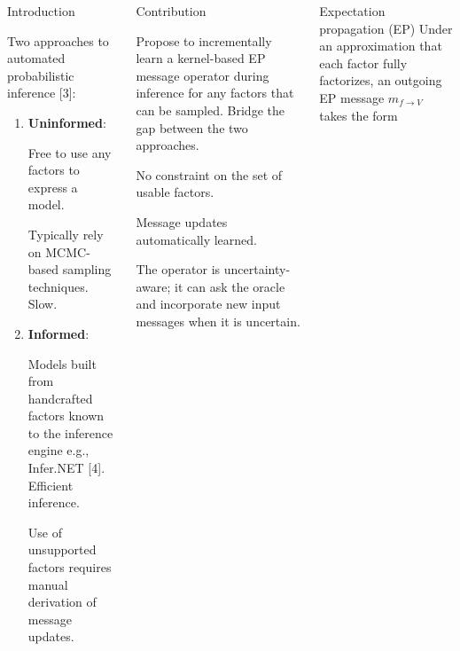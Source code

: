 \documentclass[english]{beamer}
\DeclareMathOperator*{\proj}{\text{proj}} %
\begin{document}
\newcommand{\Vskip}{\vspace{5mm}}
\begin{frame}


\vspace{-5mm}
\begin{columns}[t]


\begin{block}{Introduction }

\justifying{}Two approaches to automated probabilistic inference
{[}3{]}:
\begin{enumerate}
\item \justifying{}\textbf{Uninformed}: 


\Vskip{}\Smile{} Free to use any factors to express a model.


\Vskip{}\Frown{} Typically rely on MCMC-based sampling techniques.
Slow.

\item \textbf{Informed}: 


\Vskip{}\Smile{} Models built from handcrafted factors known to the
inference engine e.g., Infer.NET {[}4{]}. Efficient inference. 


\Vskip{}\Frown{} Use of unsupported factors requires manual derivation
of message updates. 

\end{enumerate}
\end{block}

\begin{block}{Contribution }

Propose to incrementally learn a kernel-based EP message operator 
during inference for any factors that can be sampled. 
Bridge the gap between the two approaches. 

\Vskip{}\Smile{} No constraint on the set of usable factors.

\Vskip{}\Smile{} Message updates automatically learned. 

\Vskip{}\Smile{} The operator is uncertainty-aware; it can ask
the oracle and incorporate new input messages when it is uncertain.

\end{block}

\begin{block}{Expectation propagation (EP)}
Under an approximation that each factor fully factorizes, an outgoing EP message $m_{f\rightarrow V}$ takes the form
\vspace{5mm}
 

\end{block}
\end{columns}
\end{frame}
\end{document}
